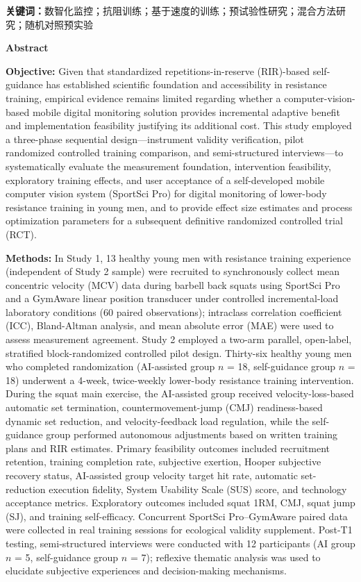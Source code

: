 \textbf{关键词：}数智化监控；抗阻训练；基于速度的训练；预试验性研究；混合方法研究；随机对照预实验

\clearpage
\begin{center}
\textbf{Abstract}
\end{center}

\textbf{Objective:} Given that standardized repetitions-in-reserve (RIR)-based self-guidance has established scientific foundation and accessibility in resistance training, empirical evidence remains limited regarding whether a computer-vision-based mobile digital monitoring solution provides incremental adaptive benefit and implementation feasibility justifying its additional cost. This study employed a three-phase sequential design---instrument validity verification, pilot randomized controlled training comparison, and semi-structured interviews---to systematically evaluate the measurement foundation, intervention feasibility, exploratory training effects, and user acceptance of a self-developed mobile computer vision system (SportSci Pro) for digital monitoring of lower-body resistance training in young men, and to provide effect size estimates and process optimization parameters for a subsequent definitive randomized controlled trial (RCT).

\textbf{Methods:} In Study 1, 13 healthy young men with resistance training experience (independent of Study 2 sample) were recruited to synchronously collect mean concentric velocity (MCV) data during barbell back squats using SportSci Pro and a GymAware linear position transducer under controlled incremental-load laboratory conditions (60 paired observations); intraclass correlation coefficient (ICC), Bland-Altman analysis, and mean absolute error (MAE) were used to assess measurement agreement. Study 2 employed a two-arm parallel, open-label, stratified block-randomized controlled pilot design. Thirty-six healthy young men who completed randomization (AI-assisted group $n$ = 18, self-guidance group $n$ = 18) underwent a 4-week, twice-weekly lower-body resistance training intervention. During the squat main exercise, the AI-assisted group received velocity-loss-based automatic set termination, countermovement-jump (CMJ) readiness-based dynamic set reduction, and velocity-feedback load regulation, while the self-guidance group performed autonomous adjustments based on written training plans and RIR estimates. Primary feasibility outcomes included recruitment retention, training completion rate, subjective exertion, Hooper subjective recovery status, AI-assisted group velocity target hit rate, automatic set-reduction execution fidelity, System Usability Scale (SUS) score, and technology acceptance metrics. Exploratory outcomes included squat 1RM, CMJ, squat jump (SJ), and training self-efficacy. Concurrent SportSci Pro--GymAware paired data were collected in real training sessions for ecological validity supplement. Post-T1 testing, semi-structured interviews were conducted with 12 participants (AI group $n$ = 5, self-guidance group $n$ = 7); reflexive thematic analysis was used to elucidate subjective experiences and decision-making mechanisms.

